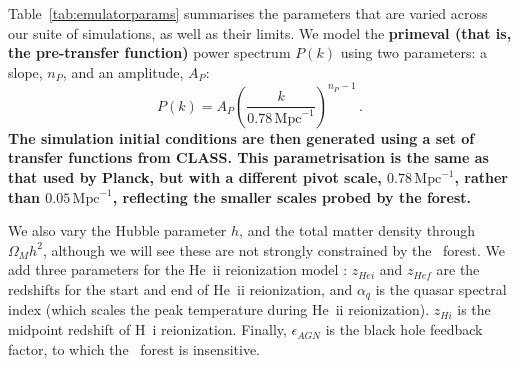 Table~\ref{tab:emulatorparams} summarises the parameters that are varied across our suite of simulations, as well as their limits.
We model the \textbf{primeval \textbf{(that is, the pre-transfer function)}} power spectrum $P(k)$  using two parameters: a slope, $n_P$, and an amplitude, $A_P$:
\begin{equation}
    P(k) = A_P \left(\frac{k}{0.78\, \mathrm{Mpc}^{-1}}\right)^{n_P - 1}\,.
\end{equation}
\textbf{The simulation initial conditions are then generated using a set of transfer functions from CLASS. This parametrisation is the same as that used by Planck, but with a different pivot scale, $0.78\, \mathrm{Mpc}^{-1}$, rather than $0.05 \,\mathrm{Mpc}^{-1}$, reflecting the smaller scales probed by the forest.}

We also vary the Hubble parameter $h$, and the total matter density through $\Omega_M h^2$, although we will see these are not strongly constrained by the \Lya~forest.
We add three parameters for the He~{\sc ii} reionization model \cite{2020MNRAS.496.4372U}: $z_{Hei}$ and $z_{Hef}$ are the redshifts for the start and end of He~{\sc ii} reionization, and $\alpha_q$ is the quasar spectral index (which scales the peak temperature during He~{\sc ii} reionization).
$z_{Hi}$ is the midpoint redshift of H~{\sc i} reionization.
Finally, $\epsilon_{AGN}$ is the black hole feedback factor, to which the \lya~forest is insensitive.

